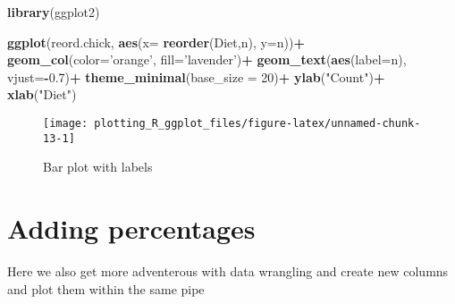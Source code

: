 \documentclass[
]{book}
\newenvironment{Shaded}{\begin{snugshade}}{\end{snugshade}}
\newcommand{\DataTypeTok}[1]{\textcolor[rgb]{0.13,0.29,0.53}{#1}}
\newcommand{\DecValTok}[1]{\textcolor[rgb]{0.00,0.00,0.81}{#1}}
\newcommand{\FloatTok}[1]{\textcolor[rgb]{0.00,0.00,0.81}{#1}}
\newcommand{\KeywordTok}[1]{\textcolor[rgb]{0.13,0.29,0.53}{\textbf{#1}}}
\newcommand{\NormalTok}[1]{#1}
\newcommand{\OperatorTok}[1]{\textcolor[rgb]{0.81,0.36,0.00}{\textbf{#1}}}
\newcommand{\StringTok}[1]{\textcolor[rgb]{0.31,0.60,0.02}{#1}}
\begin{document}
\begin{Shaded}
\begin{Highlighting}[]
\KeywordTok{library}\NormalTok{(ggplot2)}

\KeywordTok{ggplot}\NormalTok{(reord.chick, }\KeywordTok{aes}\NormalTok{(}\DataTypeTok{x=} \KeywordTok{reorder}\NormalTok{(Diet,n), }\DataTypeTok{y=}\NormalTok{n))}\OperatorTok{+}
\StringTok{  }\KeywordTok{geom_col}\NormalTok{(}\DataTypeTok{color=}\StringTok{'orange'}\NormalTok{, }\DataTypeTok{fill=}\StringTok{'lavender'}\NormalTok{)}\OperatorTok{+}
\StringTok{  }\KeywordTok{geom_text}\NormalTok{(}\KeywordTok{aes}\NormalTok{(}\DataTypeTok{label=}\NormalTok{n), }\DataTypeTok{vjust=}\OperatorTok{-}\FloatTok{0.7}\NormalTok{)}\OperatorTok{+}
\StringTok{  }\KeywordTok{theme_minimal}\NormalTok{(}\DataTypeTok{base_size =} \DecValTok{20}\NormalTok{)}\OperatorTok{+}
\StringTok{  }\KeywordTok{ylab}\NormalTok{(}\StringTok{"Count"}\NormalTok{)}\OperatorTok{+}\StringTok{ }\KeywordTok{xlab}\NormalTok{(}\StringTok{"Diet"}\NormalTok{)}
\end{Highlighting}
\end{Shaded}

\begin{figure}

{\centering \texttt{[image: plotting\_R\_ggplot\_files/figure-latex/unnamed-chunk-13-1]} 

}

\caption{Bar plot with labels}\label{fig:unnamed-chunk-13}
\end{figure}

\hypertarget{adding-percentages}{%
\section{Adding percentages}\label{adding-percentages}}

Here we also get more adventerous with data wrangling and create new columns and plot them within the same pipe
\end{document}
